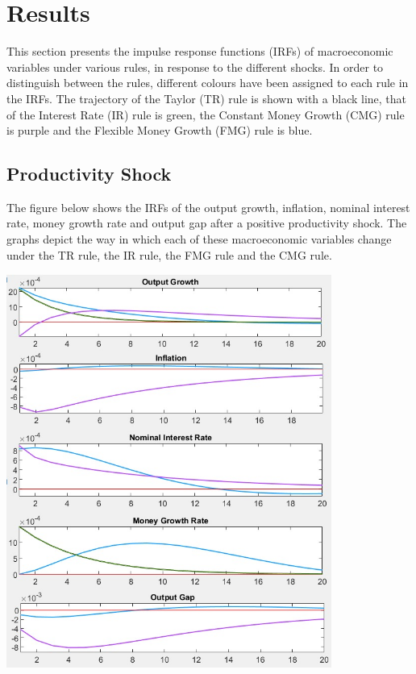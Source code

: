 \documentclass[11pt,preprint, authoryear]{elsarticle}
\let\origfigure\figure
\let\endorigfigure\endfigure
\renewenvironment{figure}[1][2] {
    \expandafter\origfigure\expandafter[H]
} {
    \endorigfigure
}
\numberwithin{equation}{section}
\numberwithin{figure}{section}
\numberwithin{table}{section}
\begin{document}
\newpage

\hypertarget{results}{%
\section{Results}\label{results}}

This section presents the impulse response functions (IRFs) of
macroeconomic variables under various rules, in response to the
different shocks. In order to distinguish between the rules, different
colours have been assigned to each rule in the IRFs. The trajectory of
the Taylor (TR) rule is shown with a black line, that of the Interest
Rate (IR) rule is green, the Constant Money Growth (CMG) rule is purple
and the Flexible Money Growth (FMG) rule is blue.

\hypertarget{productivity-shock}{%
\subsection{Productivity Shock}\label{productivity-shock}}

The figure below shows the IRFs of the output growth, inflation, nominal
interest rate, money growth rate and output gap after a positive
productivity shock. The graphs depict the way in which each of these
macroeconomic variables change under the TR rule, the IR rule, the FMG
rule and the CMG rule.

\begin{figure}
\centering
\includegraphics[width=0.8\textwidth,height=0.6\textheight]{./figures/productivity-shock.jpeg}
\caption{Plots of Impulse Response Functions for a Productivity Shock}
\end{figure}
\end{document}
